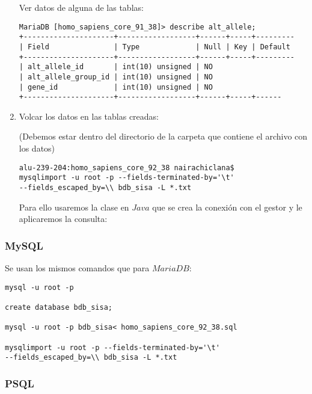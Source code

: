 \documentclass[12pt,a4paper]{article}
\begin{document}
\begin{enumerate}
\begin{verbatim}
\end{verbatim}

Ver datos de alguna de las tablas:
\begin{verbatim}
MariaDB [homo_sapiens_core_91_38]> describe alt_allele;
+---------------------+------------------+------+-----+---------
| Field               | Type             | Null | Key | Default 
+---------------------+------------------+------+-----+---------
| alt_allele_id       | int(10) unsigned | NO 
| alt_allele_group_id | int(10) unsigned | NO 
| gene_id             | int(10) unsigned | NO 
+---------------------+------------------+------+-----+------
\end{verbatim}

\item Volcar los datos en las tablas creadas:

(Debemos estar dentro del directorio de la carpeta que contiene el archivo con los datos) \cite{cDB4}

\begin{verbatim}
alu-239-204:homo_sapiens_core_92_38 nairachiclana$ 
mysqlimport -u root -p --fields-terminated-by='\t' 
--fields_escaped_by=\\ bdb_sisa -L *.txt
\end{verbatim}

Para ello usaremos la clase en $Java$ que se crea la conexión con el gestor y le aplicaremos la consulta:



\end{enumerate}

\newpage
\subsubsection{MySQL} \label{pto212}
Se usan los mismos comandos que para $MariaDB:$

\begin{verbatim}
mysql -u root -p

create database bdb_sisa;

mysql -u root -p bdb_sisa< homo_sapiens_core_92_38.sql 

mysqlimport -u root -p --fields-terminated-by='\t'  
--fields_escaped_by=\\ bdb_sisa -L *.txt
\end{verbatim}

\subsubsection{PSQL} \label{pto213}
\end{document}

